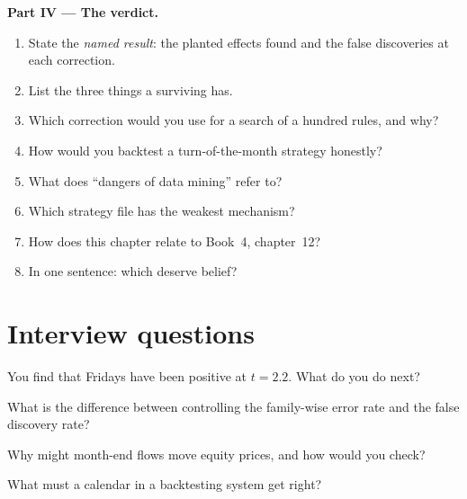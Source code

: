 \begin{problem}
\medskip\noindent\textbf{Part IV --- The verdict.}
\begin{enumerate}[resume]
\item State the \emph{named result}: the planted effects found and the false discoveries at each correction.
\item List the three things a surviving  has.
\item Which correction would you use for a search of a hundred rules, and why?
\item How would you backtest a turn-of-the-month strategy honestly?
\item What does ``dangers of data mining'' refer to?
\item Which strategy file has the weakest mechanism?
\item How does this chapter relate to Book~4, chapter~12?
\item In one sentence: which  deserve belief?
\end{enumerate}
\end{problem}

\section{Interview questions}

\begin{interviewq}\label{iq:s1:seasonality-and-calendar-effects:1}
You find that Fridays have been positive at $t = 2.2$. What do you do next?
\end{interviewq}

\begin{interviewq}\label{iq:s1:seasonality-and-calendar-effects:2}
What is the difference between controlling the family-wise error rate and the false discovery rate?
\end{interviewq}

\begin{interviewq}\label{iq:s1:seasonality-and-calendar-effects:3}
Why might month-end flows move equity prices, and how would you check?
\end{interviewq}

\begin{interviewq}\label{iq:s1:seasonality-and-calendar-effects:4}
What must a calendar in a backtesting system get right?
\end{interviewq}

